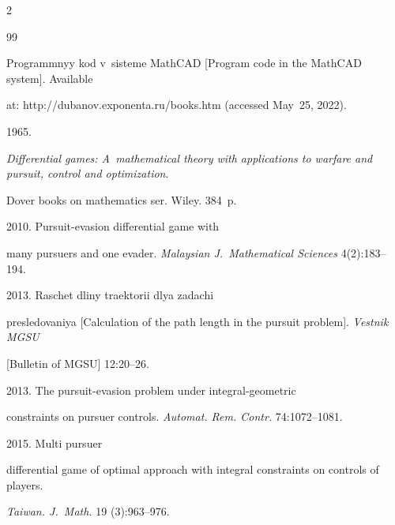 \begin{multicols}{2}
{{\begin{thebibliography}{99}


Programmnyy kod v~sisteme MathCAD [Program code in the MathCAD system]. Available 


at: {\sf http://\linebreak dubanov.exponenta.ru/books.htm} (accessed May~25, 2022).




 1965.


\textit{Differential games: A~mathematical theory with applications to warfare and pursuit, control and optimization}.


Dover books on mathematics ser. Wiley. 384~p.


{





}







 2010. Pursuit-evasion differential game with 


many pursuers and one evader. \textit{Malaysian J.~Mathematical Sciences} 4(2):183--194.







 2013. Raschet dliny traektorii dlya zadachi 


presledovaniya [Calculation of the path length in the pursuit problem]. \textit{Vestnik MGSU} 


[Bulletin of MGSU] 12:20--26.




 2013. The pursuit-evasion problem under integral-geometric 


constraints on pursuer controls. \textit{Automat. Rem. Contr.} 74:1072--1081.







 2015. Multi pursuer 


differential game of optimal approach with integral constraints on controls of players. 


\textit{Taiwan. J.~Math.} 19 (3):963--976.



\end{thebibliography}}}
\end{multicols}
